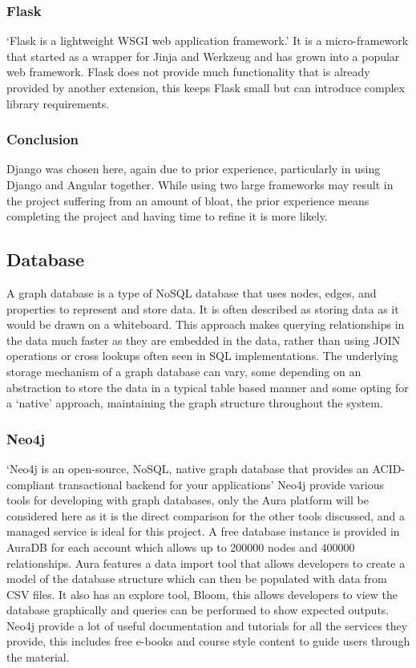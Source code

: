 \subsubsection*{Flask}
`Flask is a lightweight WSGI web application framework.'\cite{ronacherFlaskSimpleFramework} It is a micro-framework that
 started as a wrapper for Jinja and Werkzeug and has grown into a popular web framework. Flask does not provide much 
functionality that is already provided by another extension, this keeps Flask small but can introduce complex library 
requirements. 
\subsubsection*{Conclusion}
Django was chosen here, again due to prior experience, particularly in using Django and Angular together. While using 
two large frameworks may result in the project suffering from an amount of bloat, the prior experience means completing
 the project and having time to refine it is more likely.
\subsection{Database}
A graph database is a type of NoSQL database that uses nodes, edges, and properties to represent and store data. It is 
often described as storing data as it would be drawn on a whiteboard. This approach makes querying relationships in the 
data much faster as they are embedded in the data, rather than using JOIN operations or cross lookups often seen in SQL 
implementations. The underlying storage mechanism of a graph database can vary, some depending on an abstraction to store
 the data in a typical table based manner and some opting for a `native' approach, maintaining the graph structure 
throughout the system.
\subsubsection*{Neo4j}
`Neo4j is an open-source, NoSQL, native graph database that provides an ACID-compliant transactional backend for your 
applications'\cite{WhatGraphDatabaseb} Neo4j provide various tools for developing with graph databases, only the Aura 
platform will be considered here as it is the direct comparison for the other tools discussed, and a managed service is 
ideal for this project. A free database instance is provided in AuraDB for each account which allows up to 200000 nodes
 and 400000 relationships. Aura features a data import tool that allows developers to create a model of the database 
structure which can then be populated with data from CSV files. It also has an explore tool, Bloom, this allows 
developers to view the database graphically and queries can be performed to show expected outputs. Neo4j provide a lot 
of useful documentation and tutorials for all the services they provide, this includes free e-books and course style 
content to guide users through the material.
